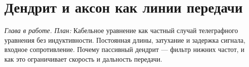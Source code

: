 \chapter{Дендрит и аксон как линии передачи}
\label{sec:cable}

\emph{Глава в работе. План:} Кабельное уравнение как частный случай телеграфного уравнения без индуктивности. Постоянная длины, затухание и задержка сигнала, входное сопротивление. Почему пассивный дендрит --- фильтр нижних частот, и как это ограничивает скорость и дальность передачи.
